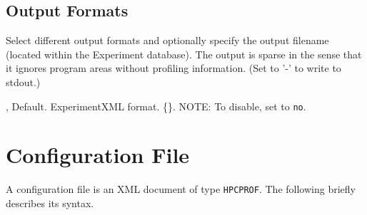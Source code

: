 \documentclass[english]{article}
\begin{document}
\subsection{Output Formats}

Select different output formats and optionally specify the output filename  (located within the Experiment database). The output is sparse in the sense that it ignores program areas without profiling information. (Set  to '-' to write to stdout.)

\begin{Description}
  \item[\OptoArg{-x}{file}, \OptoArg{--experiment}{file}] Default.  ExperimentXML format. \{\}.  NOTE: To disable, set  to \verb+no+.
\end{Description}

\section{Configuration File}

A  configuration file is an XML document of type \texttt{HPCPROF}.
The following briefly describes its syntax.
\end{document}
